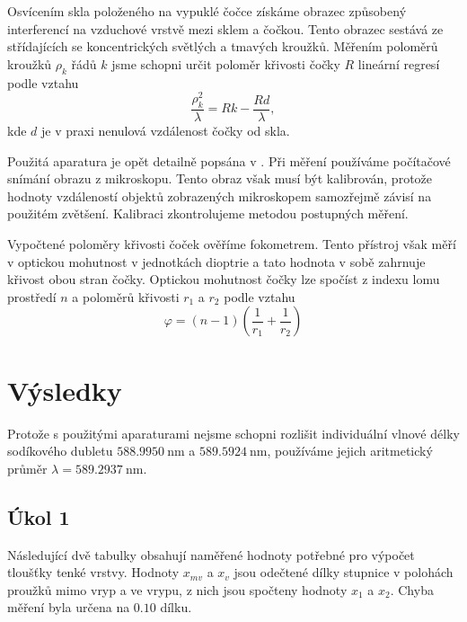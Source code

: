 \documentclass{protokol}
\begin{document}
      Osvícením skla položeného na vypuklé čočce získáme obrazec způsobený interferencí na vzduchové vrstvě mezi sklem a čočkou. Tento obrazec sestává ze střídajících se koncentrických světlých a tmavých kroužků. Měřením poloměrů kroužků $\rho_k$ řádů $k$ jsme schopni určit poloměr křivosti čočky $R$ lineární regresí podle vztahu
      \begin{equation} \label{eq:newton}
        \frac{\rho_k^2}{\lambda} = Rk - \frac{Rd}{\lambda},
      \end{equation} 
      kde $d$ je v praxi nenulová vzdálenost čočky od skla.

      Použitá aparatura je opět detailně popsána v \cite{mereni}. Při měření používáme počítačové snímání obrazu z mikroskopu. Tento obraz však musí být kalibrován, protože hodnoty vzdáleností objektů zobrazených mikroskopem samozřejmě závisí na použitém zvětšení. Kalibraci zkontrolujeme metodou postupných měření.
      
      Vypočtené poloměry křivosti čoček ověříme fokometrem. Tento přístroj však měří v optickou mohutnost v jednotkách dioptrie a tato hodnota v sobě zahrnuje křivost obou stran čočky. Optickou mohutnost čočky lze spočíst z indexu lomu prostředí $n$ a poloměrů křivosti $r_1$ a $r_2$ podle vztahu
      \begin{equation} \label{eq:mohutnost}
        \varphi = (n - 1)(\frac{1}{r_1} + \frac{1}{r_2})
      \end{equation}

  \section*{Výsledky}

    Protože s použitými aparaturami nejsme schopni rozlišit individuální vlnové délky sodíkového dubletu $\SI{588.9950}{\nano\metre}$ a $\SI{589.5924}{\nano\metre}$, používáme jejich aritmetický průměr $\lambda = \SI{589.2937}{\nano\metre}$.

    \subsection*{Úkol 1} 
      
      Následující dvě tabulky obsahují naměřené hodnoty potřebné pro výpočet tloušťky tenké vrstvy. Hodnoty $x_{mv}$ a $x_{v}$ jsou odečtené dílky stupnice v polohách proužků mimo vryp a ve vrypu, z nich jsou spočteny hodnoty $x_1$ a $x_2$. Chyba měření byla určena na $\num{0.10}$ dílku.
\end{document}
